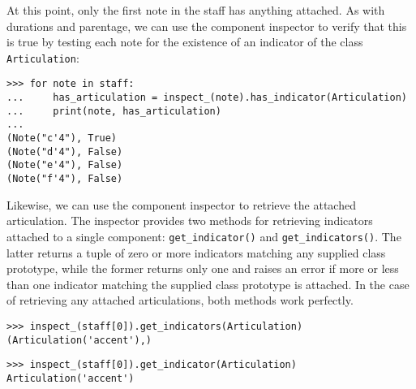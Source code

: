\noindent At this point, only the first note in the staff has anything
attached. As with durations and parentage, we can use the component inspector
to verify that this is true by testing each note for the existence of an
indicator of the class \texttt{Articulation}:

\begin{comment}
<abjad>
for note in staff:
    has_articulation = inspect_(note).has_indicator(Articulation)
    print(note, has_articulation)

</abjad>
\end{comment}

\begin{abjadbookoutput}
\begin{singlespacing}
\vspace{-0.5\baselineskip}
\begin{lstlisting}
>>> for note in staff:
...     has_articulation = inspect_(note).has_indicator(Articulation)
...     print(note, has_articulation)
...
(Note("c'4"), True)
(Note("d'4"), False)
(Note("e'4"), False)
(Note("f'4"), False)
\end{lstlisting}
\end{singlespacing}
\end{abjadbookoutput}

\noindent Likewise, we can use the component inspector to retrieve the attached
articulation. The inspector provides two methods for retrieving indicators
attached to a single component: \texttt{get\_indicator()} and
\texttt{get\_indicators()}. The latter returns a tuple of zero or more
indicators matching any supplied class prototype, while the former returns only
one and raises an error if more or less than one indicator matching the
supplied class prototype is attached. In the case of retrieving any attached
articulations, both methods work perfectly.

\begin{comment}
<abjad>[allow_exceptions]
inspect_(staff[0]).get_indicators(Articulation)
inspect_(staff[0]).get_indicator(Articulation)
</abjad>
\end{comment}

\begin{abjadbookoutput}
\begin{singlespacing}
\vspace{-0.5\baselineskip}
\begin{lstlisting}
>>> inspect_(staff[0]).get_indicators(Articulation)
(Articulation('accent'),)
\end{lstlisting}
\begin{lstlisting}
>>> inspect_(staff[0]).get_indicator(Articulation)
Articulation('accent')
\end{lstlisting}
\end{singlespacing}
\end{abjadbookoutput}

